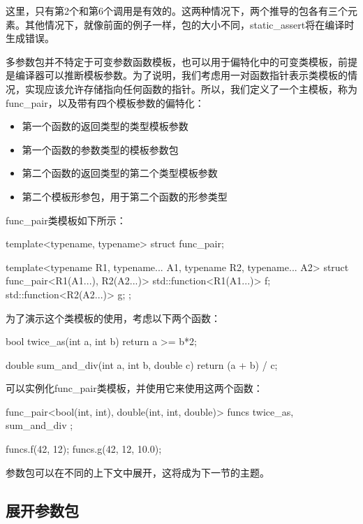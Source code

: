 这里，只有第2个和第6个调用是有效的。这两种情况下，两个推导的包各有三个元素。其他情况下，就像前面的例子一样，包的大小不同，static\_assert将在编译时生成错误。

多参数包并不特定于可变参数函数模板，也可以用于偏特化中的可变类模板，前提是编译器可以推断模板参数。为了说明，我们考虑用一对函数指针表示类模板的情况，实现应该允许存储指向任何函数的指针。所以，我们定义了一个主模板，称为func\_pair，以及带有四个模板参数的偏特化：

\begin{itemize}
\item
第一个函数的返回类型的类型模板参数

\item
第一个函数的参数类型的模板参数包

\item
第二个函数的返回类型的第二个类型模板参数

\item
第二个模板形参包，用于第二个函数的形参类型
\end{itemize}

func\_pair类模板如下所示：

\begin{cpp}
template<typename, typename>
struct func_pair;

template<typename R1, typename... A1,
         typename R2, typename... A2>
struct func_pair<R1(A1...), R2(A2...)>
{
	std::function<R1(A1...)> f;
	std::function<R2(A2...)> g;
};
\end{cpp}

为了演示这个类模板的使用，考虑以下两个函数：

\begin{cpp}
bool twice_as(int a, int b)
{
	return a >= b*2;
}

double sum_and_div(int a, int b, double c)
{
	return (a + b) / c;
}
\end{cpp}

可以实例化func\_pair类模板，并使用它来使用这两个函数：

\begin{cpp}
func_pair<bool(int, int), double(int, int, double)> funcs{
	twice_as, sum_and_div };

funcs.f(42, 12);
funcs.g(42, 12, 10.0);
\end{cpp}

参数包可以在不同的上下文中展开，这将成为下一节的主题。

\subsection{展开参数包}

